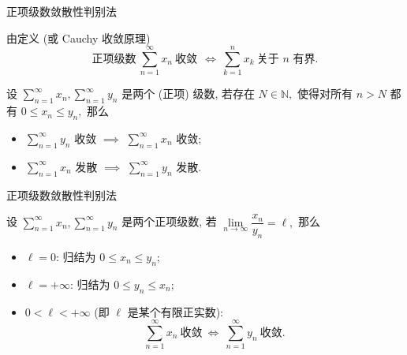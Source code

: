 \begin{frame}{正项级数敛散性判别法}

由定义 (或 Cauchy 收敛原理)
\[\text{正项级数} ~ \sum\limits_{n=1}^{\infty} x_n ~ \text{收敛} ~~ \Longleftrightarrow ~ \sum\limits_{k=1}^{n} x_k ~ \text{关于 $n$ 有界}.\]

\pause

\begin{thm}[比较判别法]
设 $\sum\limits_{n=1}^{\infty} x_n, \sum\limits_{n=1}^{\infty} y_n$ 是两个 (正项) 级数, 若存在 $N \in \mathbb{N},$ 使得对所有 $n > N$ 都有 $0 \leqslant x_n \leqslant y_n,$ 那么
\begin{itemize}
\item $\sum\limits_{n=1}^{\infty} y_n$ 收敛 $\implies$ $\sum\limits_{n=1}^{\infty} x_n$ 收敛;
\item $\sum\limits_{n=1}^{\infty} x_n$ 发散 $\implies$ $\sum\limits_{n=1}^{\infty} y_n$ 发散.
\end{itemize}
\end{thm}

\end{frame}


\begin{frame}{正项级数敛散性判别法}

\begin{thm}[比较判别法的极限形式]
设 $\sum\limits_{n=1}^{\infty} x_n, \sum\limits_{n=1}^{\infty} y_n$ 是两个正项级数, 若 $\lim\limits_{n\to\infty} \dfrac{x_n}{y_n} = \ell,$ 那么
\begin{itemize}
\item $\ell = 0$:
\pause
归结为 $0 \leqslant x_n \leqslant y_n;$
\item $\ell = +\infty$:
\pause
归结为 $0 \leqslant y_n \leqslant x_n;$
\pause
\item $0 < \ell < +\infty$ (即 $\ell$ 是某个有限正实数):
\pause
\[\sum\limits_{n=1}^{\infty} x_n ~ \text{收敛} ~ \Longleftrightarrow ~ \sum\limits_{n=1}^{\infty} y_n ~ \text{收敛}.\]
\end{itemize}
\end{thm}

\end{frame}


